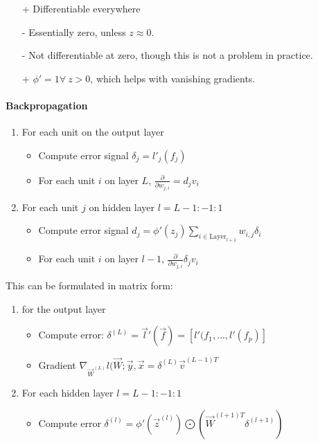 \documentclass[10pt,a4paper]{scrartcl}
\begin{document}
\begin{multicols*}{2}
\begin{itemize}
\item[+] Differentiable everywhere
\item[-] Essentially zero, unless $z\approx 0$.
\end{itemize}


\begin{itemize}
\item[-] Not differentiable at zero, though this is not a problem in practice.
\item[+] $\phi'=1\forall\ z>0$, which helps with vanishing gradients.
\end{itemize}

\paragraph{Backpropagation}

\begin{enumerate}
\item For each unit on the output layer
\begin{itemize}
\item Compute error signal $\delta_j=l'_j(f_j)$
\item For each unit $i$ on layer $L$, $\frac{\partial}{\partial w_{j,i}}=d_j v_i$
\end{itemize}
\item For each unit $j$ on hidden layer $l=L-1:-1:1$
\begin{itemize}
\item Compute error signal $d_j=\phi'(z_j)\sum\limits_{i\in\text{Layer}_{l+1}}w_{i,j}\delta_i$
\item For each unit $i$ on layer $l-1$, $\frac{\partial }{\partial w_{j,i}}\delta_j v_i$
\end{itemize}
\end{enumerate}

This can be formulated in matrix form:

\begin{enumerate}
\item for the output layer
\begin{itemize}
\item Compute error: $\delta^{(L)}=\vec{l}'(\vec{f})=[l'(f_1,\ldots,l'(f_p)]$
\item Gradient $\nabla_{\vec{W}^{(L)}}l(\vec{W};\vec{y},\vec{x}=\delta^{(L)}\vec{v}^{(L-1)T}$
\end{itemize}
\item For each hidden layer $l=L-1:-1:1$
\begin{itemize}
\item Compute error $\delta^{(l)}=\phi'\left(\vec{z}^{(l)}\right)\bigodot\left(\vec{W}^{(l+1)T}\delta^{(l+1)}\right)$


\end{itemize}
\end{enumerate}
\end{multicols*}
\end{document}
